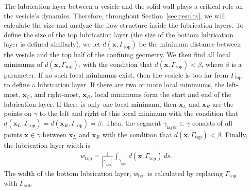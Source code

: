 \documentclass[twoside,twocolumn,9pt]{article}
\newcommand{\xx}{\mathbf{x}}
\newcommand{\yy}{\mathbf{y}}
\begin{document}
The lubrication layer between a vesicle and the solid wall plays a
critical role on the vesicle's dynamics. Therefore, throughout
Section~\ref{sec:results}, we will calculate the size and analyze the
flow structure inside the lubrication layers. 
%
To define the size of the top lubrication layer (the size of the bottom
lubrication layer is defined similarly), we let
$d(\xx,\Gamma_\mathrm{top})$ be the minimum distance between the vesicle
and the top half of the confining geometry.
We then find all local minimums of $d(\xx,\Gamma_\mathrm{top})$, with
the condition that $d(\xx,\Gamma_\mathrm{top}) < \beta$, where $\beta$
is a parameter. If no such local minimums exist, then the vesicle is too
far from $\Gamma_\mathrm{top}$ to define a lubrication layer. If there
are two or more local minimums, the left-most, $\xx_L$, and right-most,
$\xx_R$, local minimums form the start and end of the lubrication layer.
If there is only one local minimum, then $\xx_L$ and $\xx_R$ are the
points on $\gamma$ to the left and right of this local minimum with the
condition that $d(\xx_L,\Gamma_\mathrm{top}) =
d(\xx_R,\Gamma_\mathrm{top}) = \beta$. Then, the segment
$\gamma_{\mathrm{layer}} \subset \gamma$ consists of all points $\xx \in
\gamma$ between $\xx_L$ and $\xx_R$ with the condition that
$d(\xx,\Gamma_\mathrm{top}) < \beta$. Finally, the lubrication layer
width is
\begin{align}
    w_\mathrm{top} = \frac{1}{|\gamma_{_\mathrm{layer}}|} \int_{\gamma_{_\mathrm{layer}}} d(\xx,\Gamma_\mathrm{top}) \, ds.
\end{align}
The width of the bottom lubrication layer, $w_\mathrm{bot}$ is
calculated by replacing $\Gamma_\mathrm{top}$ with
$\Gamma_\mathrm{bot}$. 
\end{document}
